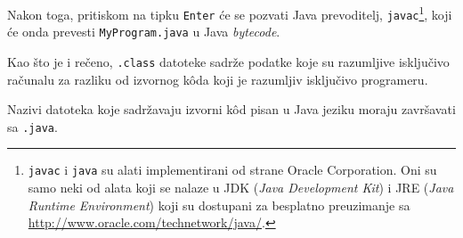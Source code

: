 Nakon toga, pritiskom na tipku \texttt{Enter} će se pozvati Java prevoditelj, \texttt{javac}\footnote{\texttt{javac} i \texttt{java} su alati implementirani od strane Oracle Corporation. Oni su samo neki od alata koji se nalaze u JDK (\emph{Java Development Kit}) i JRE (\emph{Java Runtime Environment}) koji su dostupani za besplatno preuzimanje sa \url{http://www.oracle.com/technetwork/java/}.}, koji će onda prevesti \texttt{MyProgram.java} u Java \emph{bytecode}.

Kao što je i rečeno, \texttt{.class} datoteke sadrže podatke koje su razumljive isključivo računalu za razliku od izvornog kôda koji je razumljiv isključivo programeru.

\begin{infobox}
    Nazivi datoteka koje sadržavaju izvorni kôd pisan u Java jeziku moraju završavati sa \texttt{.java}.
\end{infobox}